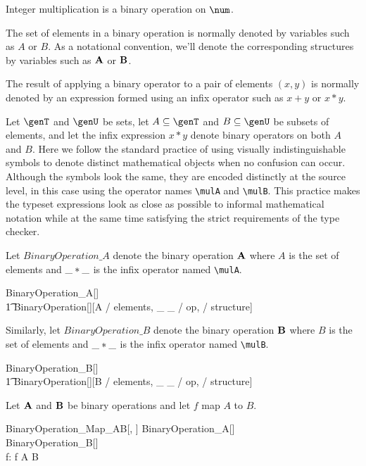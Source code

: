 \documentclass{amsart}
\begin{document}
\begin{example}
Integer multiplication is a binary operation on $\num$.
\end{example}

The set of elements in a binary operation is normally denoted by variables such as $A$ or $B$.
As a notational convention, we'll denote the corresponding structures by variables such as $\mathbf{A}$ or $\mathbf{B}$.

The result of applying a binary operator to a pair of elements $(x, y)$ 
is normally denoted by an expression formed using an infix operator such as $x + y$ or $x * y$.

Let $\genT$ and $\genU$ be sets, 
let $A \subseteq \genT$ and $B \subseteq \genU$ be subsets of elements,
and let the infix expression $x * y$ denote binary operators on both $A$ and $B$.
Here we follow the standard practice of using visually indistinguishable symbols to denote distinct mathematical
objects when no confusion can occur.
Although the symbols look the same, they are encoded distinctly at the source level,
in this case using the operator names \verb|\mulA| and \verb|\mulB|.
This practice makes the typeset expressions look as close as possible to informal mathematical notation
while at the same time satisfying the strict requirements of the type checker.

Let $BinaryOperation\_A$ denote the binary operation $\mathbf{A}$ where $A$ is the set of elements and 
$\_  \mathbin{*} \_$ is the infix operator named \verb|\mulA|.
\begin{zed}
	BinaryOperation\_A[\genT]  \\
	\t1	BinaryOperation[\genT][A / elements, \_ \mulA \_ / op, \strucA / structure]
\end{zed}

Similarly, let $BinaryOperation\_B$ denote the binary operation $\mathbf{B}$ where $B$ is the set of elements and 
$\_ \mathbin{*} \_$ is the infix operator named \verb|\mulB|.
\begin{zed}
	BinaryOperation\_B[\genT]  \\
	\t1	BinaryOperation[\genT][B / elements, \_ \mulB \_ / op, \strucB / structure]
\end{zed}

Let $\mathbf{A}$ and $\mathbf{B}$ be binary operations and let $f$ map $A$ to $B$.
\begin{schema}{BinaryOperation\_Map\_AB}[\genT, \genU]
	BinaryOperation\_A[\genT] \\
	BinaryOperation\_B[\genU] \\
	f: \genT \pfun \genU
\where
	f \in A \fun B
\end{schema}
\end{document}
